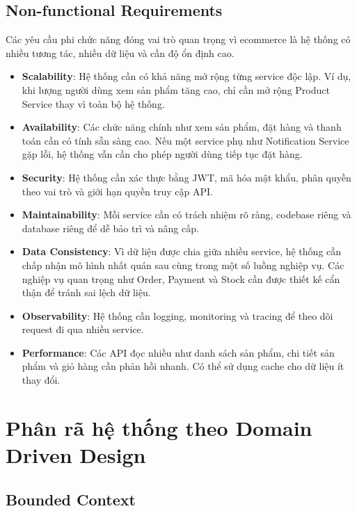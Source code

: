\subsection{Non-functional Requirements}

Các yêu cầu phi chức năng đóng vai trò quan trọng vì ecommerce là hệ thống có nhiều tương tác, nhiều dữ liệu và cần độ ổn định cao.

\begin{itemize}
  \item \textbf{Scalability}: Hệ thống cần có khả năng mở rộng từng service độc lập. Ví dụ, khi lượng người dùng xem sản phẩm tăng cao, chỉ cần mở rộng Product Service thay vì toàn bộ hệ thống.

  \item \textbf{Availability}: Các chức năng chính như xem sản phẩm, đặt hàng và thanh toán cần có tính sẵn sàng cao. Nếu một service phụ như Notification Service gặp lỗi, hệ thống vẫn cần cho phép người dùng tiếp tục đặt hàng.

  \item \textbf{Security}: Hệ thống cần xác thực bằng JWT, mã hóa mật khẩu, phân quyền theo vai trò và giới hạn quyền truy cập API.

  \item \textbf{Maintainability}: Mỗi service cần có trách nhiệm rõ ràng, codebase riêng và database riêng để dễ bảo trì và nâng cấp.

  \item \textbf{Data Consistency}: Vì dữ liệu được chia giữa nhiều service, hệ thống cần chấp nhận mô hình nhất quán sau cùng trong một số luồng nghiệp vụ. Các nghiệp vụ quan trọng như Order, Payment và Stock cần được thiết kế cẩn thận để tránh sai lệch dữ liệu.

  \item \textbf{Observability}: Hệ thống cần logging, monitoring và tracing để theo dõi request đi qua nhiều service.

  \item \textbf{Performance}: Các API đọc nhiều như danh sách sản phẩm, chi tiết sản phẩm và giỏ hàng cần phản hồi nhanh. Có thể sử dụng cache cho dữ liệu ít thay đổi.
\end{itemize}

\section{Phân rã hệ thống theo Domain Driven Design}

\subsection{Bounded Context}

